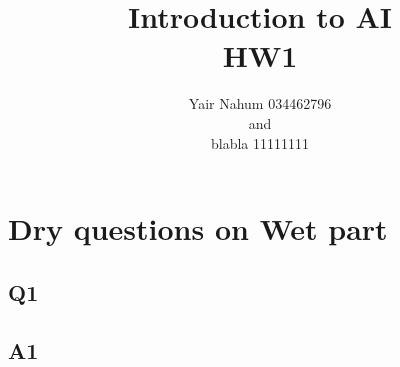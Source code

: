 \documentclass[12pt]{article}
\title{Introduction to AI\\HW1}
\author{Yair Nahum 034462796\\and\\blabla 11111111 }
\begin{document}
\maketitle


\section*{Dry questions on Wet part}

\subsection*{Q1}
\subsection*{A1}
\end{document}
